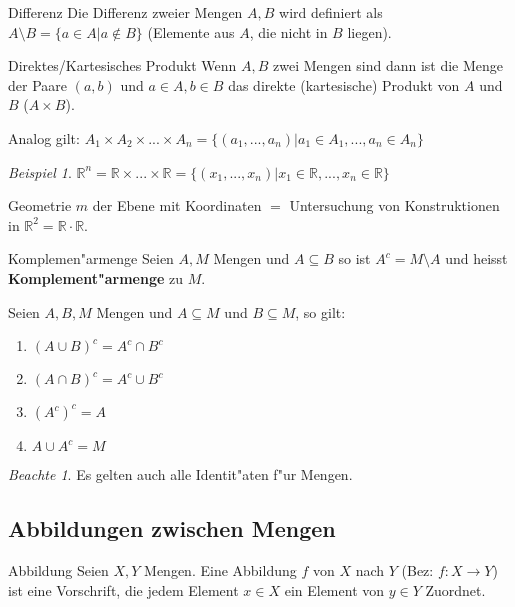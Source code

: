 \documentclass[11pt]{article}
\theoremstyle{remark}
\newtheorem{exa}{Beispiel}[section]
\newtheorem*{notte}{Beachte}
\theoremstyle{definition}
\theoremstyle{remark}
\begin{document}
\begin{definition}{Differenz}{}
Die Differenz zweier Mengen \(A, B\) wird definiert als \(A\setminus B = \{a\in A | a\not\in
B\}\) (Elemente aus \(A\), die nicht in \(B\) liegen). 
\end{definition}

\begin{definition}{Direktes/Kartesisches Produkt}{}
Wenn \(A,B\) zwei Mengen sind dann ist die Menge der Paare \((a,b)\) und \(a\in A,
b\in B\) das direkte (kartesische) Produkt von \(A\) und \(B\) (\(A\times B\)).
\end{definition}

Analog gilt: \(A_1\times A_2\times ... \times A_n = \{(a_1,...,a_n)| a_1\in A_1,...,a_n\in A_n\}\)

\begin{exa}
\(\mathbb{R}^n=\mathbb{R}\times ... \times \mathbb{R} =  \{(x_1,...,x_n)| x_1\in \mathbb{R},...,x_n\in \mathbb{R}\}\)
\end{exa}

Geometrie \(m\) der Ebene mit Koordinaten \(=\) Untersuchung von Konstruktionen in
\(\mathbb{R}^2=\mathbb{R}\cdot\mathbb{R}\).

\begin{definition}{Komplemen"armenge}
Seien \(A,M\) Mengen und \(A\subseteq B\) so ist \(A^c = M\setminus A\) und heisst
\textbf{Komplement"armenge} zu \(M\).
\end{definition}

Seien \(A,B,M\) Mengen und \(A\subseteq M\) und \(B\subseteq M\), so gilt:
\begin{relation}
\begin{enumerate}
\item \((A\cup B)^c = A^c \cap B^c\)
\item \((A\cap B)^c = A^c \cup B^c\)
\item \((A^c)^c = A\)
\item \(A\cup A^c = M\)
\end{enumerate}
\end{relation}

\begin{notte}
Es gelten auch alle Identit"aten f"ur Mengen.
\end{notte}


\subsection{Abbildungen zwischen Mengen}
\label{sec:org4ef8946}
\begin{definition}{Abbildung}{}
Seien \(X,Y\) Mengen. Eine Abbildung \(f\) von \(X\) nach \(Y\) (Bez: \(f:X\rightarrow
Y\)) ist eine Vorschrift, die jedem Element \(x\in X\) ein Element von
\(y\in Y\) Zuordnet.
\end{definition}
\end{document}
